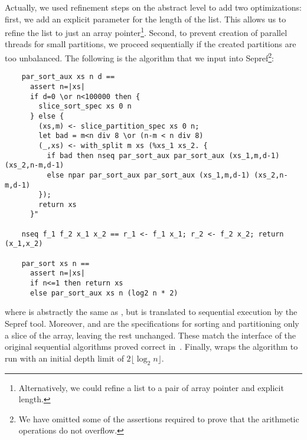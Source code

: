 \documentclass[runningheads]{llncs}
\begin{document}
  Actually, we used refinement steps on the abstract level to add two optimizations:
  first, we add an explicit parameter for the length of the list. This allows us to refine the list
  to just an array pointer\footnote{Alternatively, we could refine a list to a pair of array pointer and explicit length.}.
  Second, to prevent creation of parallel threads for small partitions, we proceed sequentially if the created partitions
  are too unbalanced. The following is the algorithm that we input into Sepref\footnote{We have omitted some
  of the assertions required to prove that the arithmetic operations do not overflow.}:
  \begin{lstlisting}
    par_sort_aux xs n d ==
      assert n=|xs|
      if d=0 \or n<100000 then {
        slice_sort_spec xs 0 n
      } else {
        (xs,m) <- slice_partition_spec xs 0 n;
        let bad = m<n div 8 \or (n-m < n div 8)
        (_,xs) <- with_split m xs (%xs_1 xs_2. {
          if bad then nseq par_sort_aux par_sort_aux (xs_1,m,d-1) (xs_2,n-m,d-1)
          else npar par_sort_aux par_sort_aux (xs_1,m,d-1) (xs_2,n-m,d-1)
        });
        return xs
      }"

    nseq f_1 f_2 x_1 x_2 == r_1 <- f_1 x_1; r_2 <- f_2 x_2; return (x_1,x_2)

    par_sort xs n ==
      assert n=|xs|
      if n<=1 then return xs
      else par_sort_aux xs n (log2 n * 2)

  \end{lstlisting}
  where  is abstractly the same as , but is translated to sequential execution by the Sepref tool.
  Moreover,  and  are the specifications for sorting and partitioning
  only a slice of the array, leaving the rest unchanged. These match the interface of the original sequential algorithms
  proved correct in~\cite{La20}. Finally,  wraps the algorithm to run with an initial depth limit of $2\lfloor\log_2 n\rfloor$.
\end{document}
